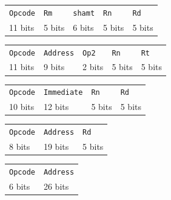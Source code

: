 \documentclass[11pt]{article}
\begin{document}
\begin{table}[htbp]
  \centering

  \begin{minipage}[t]{0.45\textwidth}
    \centering
    \begin{tabular}{|l|l|l|l|l|}
      \hline
      \texttt{Opcode} & \texttt{Rm} & \texttt{shamt} & \texttt{Rn} & \texttt{Rd} \\
      11 bits & 5 bits & 6 bits  & 5 bits  & 5 bits \\
      \hline
    \end{tabular}
  \end{minipage}\hfill
  \begin{minipage}[t]{0.45\textwidth}
    \centering
    \begin{tabular}{|l|l|l|l|l|}
      \hline
      \texttt{Opcode} & \texttt{Address} & \texttt{Op2} & \texttt{Rn} & \texttt{Rt} \\
      11 bits & 9 bits & 2 bits  & 5 bits  & 5 bits \\
      \hline
    \end{tabular}
  \end{minipage}

  \vspace{1em}

  \begin{minipage}[t]{0.45\textwidth}
    \centering
    \begin{tabular}{|l|l|l|l|}
      \hline
      \texttt{Opcode} & \texttt{Immediate} & \texttt{Rn} & \texttt{Rd} \\
      10 bits & 12 bits & 5 bits  & 5 bits \\
      \hline
    \end{tabular}
  \end{minipage}\hfill
  \begin{minipage}[t]{0.45\textwidth}
    \centering
    \begin{tabular}{|l|l|l|}
      \hline
      \texttt{Opcode} & \texttt{Address} & \texttt{Rd} \\
      8 bits & 19 bits & 5 bits \\
      \hline
    \end{tabular}
  \end{minipage}

  \vspace{1em}

  \begin{minipage}[t]{0.5\textwidth}
    \centering
    \begin{tabular}{|l|l|}
      \hline
      \texttt{Opcode} & \texttt{Address} \\
      6 bits & 26 bits \\
      \hline
    \end{tabular}
  \end{minipage}

\end{table}
\end{document}
